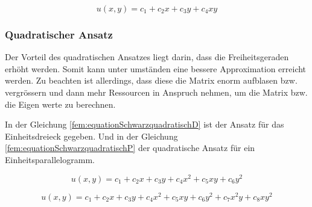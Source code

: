 \begin{equation}
	u(x,y) = c_1 + c_2 x + c_3 y + c_4 xy
\end{equation} 


\subsubsection{Quadratischer Ansatz
\label{fem:subsection:bonorum}}

Der Vorteil des quadratischen Ansatzes liegt darin, dass die Freiheitsgeraden erhöht werden. Somit kann unter umständen eine bessere Approximation erreicht werden.
Zu beachten ist allerdings, dass diese die Matrix enorm aufblasen bzw. vergrössern und dann mehr Ressourcen in Anspruch nehmen, um die Matrix bzw. die Eigen werte zu berechnen.

In der Gleichung \ref{fem:equationSchwarzquadratischD}  ist der Ansatz für das Einheitsdreieck gegeben. Und in der Gleichung \ref{fem:equationSchwarzquadratischP} der quadratische Ansatz für ein Einheitsparallelogramm.

\begin{equation}
	u(x,y) = c_1 + c_2 x + c_3 y + c_4 x^2 + c_5 xy + c_6 y^2
	\label{fem:equationSchwarzquadratischD}
\end{equation}

\begin{equation}
	u(x,y) = c_1 + c_2 x + c_3 y + c_4 x^2 + c_5 xy + c_6 y^2 + c_7 x^2y + c_8 xy^2
	\label{fem:equationSchwarzquadratischP}
\end{equation} 



